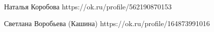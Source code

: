  
 
 
 
 

Наталья Коробова 
https://ok.ru/profile/562190870153 			

Светлана Воробьева (Кашина)
https://ok.ru/profile/164873991016
